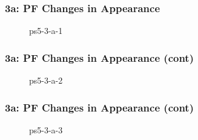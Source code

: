 \documentclass[../report.tex]{subfiles}
\begin{document}
    \begin{frame}
        \frametitle{3a: PF Changes in Appearance}
        \begin{figure}[!htb]
            \centering
            \caption{ps5-3-a-1}
        \end{figure}
    \end{frame}

    \begin{frame}
        \frametitle{3a: PF Changes in Appearance (cont)}
        \begin{figure}[!htb]
            \centering
            \caption{ps5-3-a-2}
        \end{figure}
    \end{frame}

    \begin{frame}
        \frametitle{3a: PF Changes in Appearance (cont)}
        \begin{figure}[!htb]
            \centering
            \caption{ps5-3-a-3}
        \end{figure}
    \end{frame}
    
\end{document}
